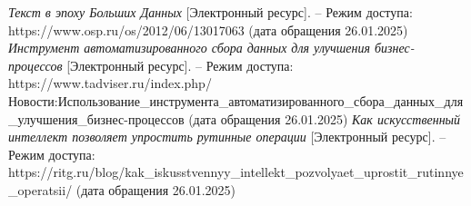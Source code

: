 \begin{thebibliography}{}
	\textit{Текст в эпоху Больших Данных} [Электронный ресурс]. --
	Режим доступа: https://www.osp.ru/os/2012/06/13017063 (дата обращения 26.01.2025)
	\textit{Инструмент автоматизированного сбора данных для улучшения бизнес-процессов} [Электронный ресурс]. --
	Режим доступа: https://www.tadviser.ru/index.php/Новости:Использование\_инструмента\_автоматизированного\_сбора\_данных\_для\_улучшения\_бизнес-процессов (дата обращения 26.01.2025)
	\textit{Как искусственный интеллект позволяет упростить рутинные операции} [Электронный ресурс]. --
	Режим доступа: https://ritg.ru/blog/kak\_iskusstvennyy\_intellekt\_pozvolyaet\_uprostit\_rutinnye\_operatsii/ (дата обращения 26.01.2025)





\end{thebibliography}